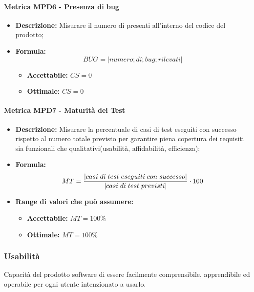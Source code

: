 \paragraph{Metrica MPD6 - Presenza di bug} %
\begin{itemize}
	\item \textbf{Descrizione:} Misurare il numero di  presenti all'interno del codice del prodotto;
	\item \textbf{Formula:} $$BUG = {|numero ; di ; bug ; rilevati|}$$
		\begin{itemize}
		\item \textbf{Accettabile:} $CS = 0 $
		\item \textbf{Ottimale:} $CS = 0 $
	\end{itemize}
\end{itemize}

\paragraph{Metrica MPD7 - Maturità dei Test} 
\begin{itemize}
	\item \textbf{Descrizione:} Misurare la percentuale di casi di test eseguiti con successo rispetto al numero totale previsto per garantire piena copertura dei requisiti sia funzionali che qualitativi(usabilità, affidabilità, efficienza);
	\item \textbf{Formula:} $$MT = {|casi \; di \; test \; eseguiti \; con \; successo| \over |casi \; di \; test \; previsti|} \cdot 100$$
	\item \textbf{Range di valori che può assumere:}
	\begin{itemize}
		\item \textbf{Accettabile:} $MT = 100\% $
		\item \textbf{Ottimale:} $MT = 100\% $
	\end{itemize}
\end{itemize}

       
\subsubsection{Usabilità}
Capacità del prodotto software di essere facilmente comprensibile, apprendibile ed operabile per ogni utente intenzionato a usarlo.

